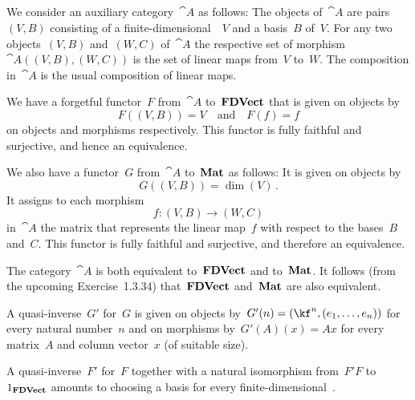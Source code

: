 \subsection{}

We consider an auxiliary category~$\cat{A}$ as follows:
The objects of~$\cat{A}$ are pairs~$(V, B)$ consisting of a finite-dimensional~\vectorspace{$\kf$}~$V$ and a basis~$B$ of~$V$.
For any two objects~$(V, B)$ and~$(W, C)$ of~$\cat{A}$ the respective set of morphism~$\cat{A}( (V, B), (W, C) )$ is the set of linear maps from~$V$ to~$W$.
The composition in~$\cat{A}$ is the usual composition of linear maps.

We have a forgetful functor~$F$ from~$\cat{A}$ to~$\mathbf{FDVect}$ that is given on objects by
\[
	F((V, B)) = V
	\quad\text{and}\quad
	F(f) = f
\]
on objects and morphisms respectively.
This functor is fully faithful and surjective, and hence an equivalence.

We also have a functor~$G$ from~$\cat{A}$ to~$\mathbf{Mat}$ as follows:
It is given on objects by
\[
	G( (V, B) ) = \dim(V) \,.
\]
It assigns to each morphism
\[
	f \colon (V, B) \to (W, C)
\]
in~$\cat{A}$ the matrix that represents the linear map~$f$ with respect to the bases~$B$ and~$C$.
This functor is fully faithful and surjective, and therefore an equivalence.

The category~$\cat{A}$ is both equivalent to~$\mathbf{FDVect}$ and to~$\mathbf{Mat}$.
It follows (from the upcoming Exercise~1.3.34) that~$\mathbf{FDVect}$ and~$\mathbf{Mat}$ are also equivalent.

A quasi-inverse~$G'$ for~$G$ is given on objects by~$G'(n) = (\kf^n, (e_1, \dotsc, e_n))$ for every natural number~$n$ and on morphisms by~$G'(A)(x) = Ax$ for every matrix~$A$ and column vector~$x$ (of suitable size).

A quasi-inverse~$F'$ for~$F$ together with a natural isomorphism from~$F' F$ to~$1_{\mathbf{FDVect}}$ amounts to choosing a basis for every finite-dimensional~\vectorspace{$\kf$}.

